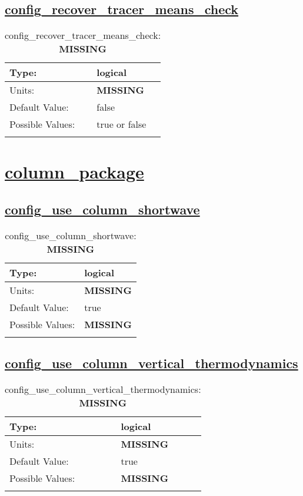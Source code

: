 \subsection[config\_recover\_tracer\_means\_check]{\hyperref[sec:nm_tab_advection]{config\_recover\_tracer\_means\_check}}
\label{subsec:nm_sec_config_recover_tracer_means_check}
\begin{center}
\begin{longtable}{| p{2.0in} || p{4.0in} |}
    \hline
    Type: & logical \\
    \hline
    Units: & {\bf \color{red} MISSING} \\
    \hline
    Default Value: & false \\
    \hline
    Possible Values: & true or false \\
    \hline
    \caption{config\_recover\_tracer\_means\_check: {\bf \color{red} MISSING}}
\end{longtable}
\end{center}
\section[column\_package]{\hyperref[sec:nm_tab_column_package]{column\_package}}
\label{sec:nm_sec_column_package}
\subsection[config\_use\_column\_shortwave]{\hyperref[sec:nm_tab_column_package]{config\_use\_column\_shortwave}}
\label{subsec:nm_sec_config_use_column_shortwave}
\begin{center}
\begin{longtable}{| p{2.0in} || p{4.0in} |}
    \hline
    Type: & logical \\
    \hline
    Units: & {\bf \color{red} MISSING} \\
    \hline
    Default Value: & true \\
    \hline
    Possible Values: & {\bf \color{red} MISSING} \\
    \hline
    \caption{config\_use\_column\_shortwave: {\bf \color{red} MISSING}}
\end{longtable}
\end{center}
\subsection[config\_use\_column\_vertical\_thermodynamics]{\hyperref[sec:nm_tab_column_package]{config\_use\_column\_vertical\_thermodynamics}}
\label{subsec:nm_sec_config_use_column_vertical_thermodynamics}
\begin{center}
\begin{longtable}{| p{2.0in} || p{4.0in} |}
    \hline
    Type: & logical \\
    \hline
    Units: & {\bf \color{red} MISSING} \\
    \hline
    Default Value: & true \\
    \hline
    Possible Values: & {\bf \color{red} MISSING} \\
    \hline
    \caption{config\_use\_column\_vertical\_thermodynamics: {\bf \color{red} MISSING}}
\end{longtable}
\end{center}
